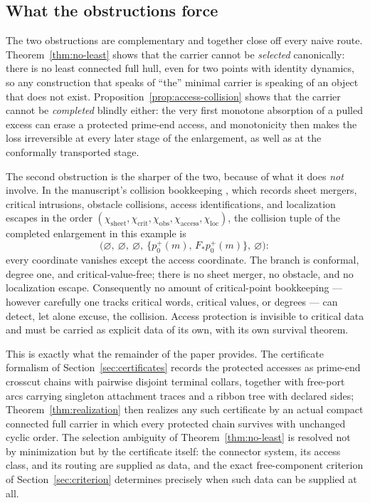 \documentclass[11pt,reqno]{amsart}
\theoremstyle{definition}
\theoremstyle{remark}
\begin{document}
\subsection{What the obstructions force}\label{subsec:B-moral}

The two obstructions are complementary and together close off every naive
route. Theorem~\ref{thm:no-least} shows that the carrier cannot be
\emph{selected} canonically: there is no least connected full hull, even for
two points with identity dynamics, so any construction that speaks of ``the''
minimal carrier is speaking of an object that does not exist.
Proposition~\ref{prop:access-collision} shows that the carrier cannot be
\emph{completed} blindly either: the very first monotone absorption of a
pulled excess can erase a protected prime-end access, and monotonicity then
makes the loss irreversible at every later stage of the enlargement, as well
as at the conformally transported stage.

The second obstruction is the sharper of the two, because of what it does
\emph{not} involve. In the manuscript's collision bookkeeping \cite{MWman},
which records sheet mergers, critical intrusions, obstacle collisions, access
identifications, and localization escapes in the order
$(\chi_{\mathrm{sheet}},\chi_{\mathrm{crit}},\chi_{\mathrm{obs}},
\chi_{\mathrm{access}},\chi_{\mathrm{loc}})$, the collision tuple of the
completed enlargement in this example is
\[
\bigl(\varnothing,\ \varnothing,\ \varnothing,\
\{p_0^{+}(m),\,F_{*}p_0^{+}(m)\},\ \varnothing\bigr):
\]
every coordinate vanishes except the access coordinate. The
branch is conformal, degree one, and critical-value-free; there is no sheet
merger, no obstacle, and no localization escape. Consequently no amount of
critical-point bookkeeping --- however carefully one tracks critical words,
critical values, or degrees --- can detect, let alone excuse, the collision.
Access protection is invisible to critical data and must be carried as
explicit data of its own, with its own survival theorem.

This is exactly what the remainder of the paper provides. The certificate
formalism of Section~\ref{sec:certificates} records the protected accesses as
prime-end crosscut chains \cite{Pom92} with pairwise disjoint terminal
collars, together with free-port arcs carrying singleton attachment traces
and a ribbon tree with declared sides; Theorem~\ref{thm:realization} then
realizes any such certificate by an actual compact connected full carrier in
which every protected chain survives with unchanged cyclic order. The
selection ambiguity of Theorem~\ref{thm:no-least} is resolved not by
minimization but by the certificate itself: the connector system, its access
class, and its routing are supplied as data, and the exact free-component
criterion of Section~\ref{sec:criterion} determines precisely when such data
can be supplied at all.
\end{document}
